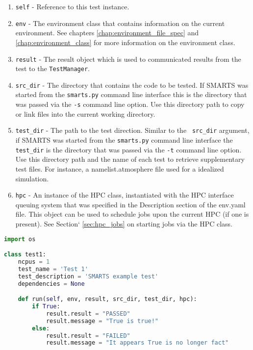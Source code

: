 \begin{enumerate}
    \item {\tt self} - Reference to this test instance.
    \item {\tt env} - The environment class that contains information on the
    current environment. See chapters \ref{chap:environment_file_spec} and
    \ref{chap:environment_class} for more information on the environment class.
    \item {\tt result} - The result object which is used to communicated
    results from the test to the {\tt TestManager}.
    \item {\tt src\_dir} - The directory that contains the code to be tested.
    If SMARTS was started from the {\tt smarts.py} command line interface this
    is the directory that was passed via the {\tt -s} command line option. Use
    this directory path to copy or link files into the current working
    directory.
    \item {\tt test\_dir} - The path to the test direction. Similar to the {\tt
    src\_dir} argument, if SMARTS was started from the {\tt smarts.py} command
    line interface the {\tt test\_dir} is the directory that was passed via the
    {\tt -t} command line option. Use this directory path and the name of each
    test to retrieve supplementary test files. For instance, a 
    namelist.atmosphere file used for a idealized simulation.
    \item {\tt hpc} - An instance of the HPC class, instantiated with the HPC
    interface queuing system that was specified in the Description section of
    the env.yaml file. This object can be used to schedule jobs upon the
    current HPC (if one is present). See Section` \ref{sec:hpc_jobs} on starting
    jobs via the HPC class.
\end{enumerate}

\begin{lstlisting}[language=Python, 
                   caption={Example test1.py},
                   label={lst:example_test}]
import os

class test1:
    ncpus = 1
    test_name = 'Test 1'
    test_description = 'SMARTS example test'
    dependencies = None

    def run(self, env, result, src_dir, test_dir, hpc):
        if True:
            result.result = "PASSED"
            result.message = "True is true!"
        else:
            result.result = "FAILED"
            result.message = "It appears True is no longer fact"
\end{lstlisting}

